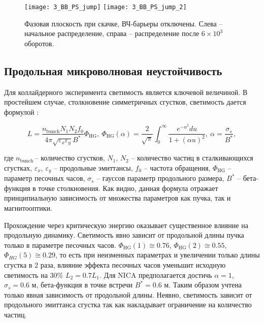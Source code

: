 \begin{figure}[!h]
   \texttt{[image: 3\_BB\_PS\_jump]}
   \texttt{[image: 3\_BB\_PS\_jump\_2]}
   \caption{Фазовая плоскость при скачке, ВЧ-барьеры отключены. Слева – начальное распределение, справа – распределение после $6\times{10}^3$ оборотов.}
   \label{fig:BB_PS_jump}
\end{figure}

\subsection{Продольная микроволновая неустойчивость}\label{sec:transition_jump/microwave_instab}

\par Для коллайдерного эксперимента светимость является ключевой величиной. В простейшем случае, столкновение симметричных сгустков, светимость дается формулой \cite{meshkov:luminocity}:

\begin{equation}
L=\frac{n_{\mathrm{bunch}}N_1N_2f_0}{4\pi\sqrt{\varepsilon_x\varepsilon_y}B^\ast}\Phi_{\textrm{HG}}, \
\Phi_{\textrm{HG}}(\alpha)=\frac{2}{\sqrt\pi}\int_{0}^{\infty}\frac{e^{-u^2}du}{1+(\alpha u)^2},\
\alpha=\frac{\sigma_s}{B^\ast},
\label{eq:luminocity}
\end{equation}

\noindent где $n_{\mathrm{bunch\ }}$– количество сгустков, $N_1$, $N_2$ – количество частиц в сталкивающихся сгустках, $\varepsilon_x$, $\varepsilon_y$ – продольные эмиттансы, $f_0$ – частота обращения, $\Phi_{\textrm{HG}}$ – параметр песочных часов, $\sigma_s$ – гауссов параметр продольного размера, $B^\ast$ – бета-функция в точке столкновения. Как видно, данная формула отражает принципиальную зависимость от множества параметров как пучка, так и магнитооптики.

\par Прохождение через критическую энергию оказывает существенное влияние на продольную динамику. Светимость явно зависит от продольной длины пучка только в параметре песочных часов. $\Phi_{\textrm{HG}}(1)\cong0.76$, $\Phi_{\textrm{HG}}(2)\cong0.55$, $\Phi_{HG}(5)\cong0.29$, то есть при неизменных параметрах и увеличении только длины сгустка в $2$ раза, влияние эффекта песочных часов уменьшит исходную светимость на $30\%$ $L_2=0.7L_1$. Для NICA предполагается достичь $\alpha=1$, $\sigma_s=0.6$ м, бета-функция в точке встречи $B^\ast=0.6$ м. Таким образом учтена только явная зависимость от продольной длины. Неявно, светимость зависит от продольного эмиттанса сгустка так как накладывает ограничение на количество частиц.

